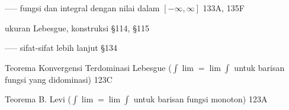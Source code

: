 ----- fungsi dan integral dengan nilai dalam $[-\infty,\infty]$ 133A, 135F




















































\indexmedskip













ukuran Lebesgue, konstruksi \S114, \S115

----- sifat-sifat lebih lanjut \S134



Teorema Konvergensi Terdominasi Lebesgue ($\int\lim=\lim\int$
untuk barisan fungsi yang didominasi) 123C

Teorema B. Levi ($\int\lim=\lim\int$
untuk barisan fungsi monoton) 123A













































